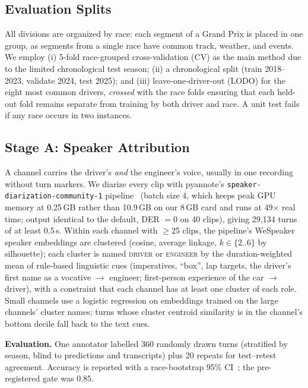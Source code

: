 \subsection{Evaluation Splits}
All divisions are organized by race: each segment of a Grand Prix is placed in one group, as segments from a single race have common track, weather, and events. We employ (i) 5-fold race-grouped cross-validation (CV) as the main method due to the limited chronological test season; (ii) a chronological split (train 2018--2023, validate 2024, test 2025); and (iii) leave-one-driver-out (LODO) for the eight most common drivers, \emph{crossed} with the race folds ensuring that each held-out fold remains separate from training by both driver and race. A unit test fails if any race occurs in two instances.


\subsection{Stage A: Speaker Attribution}
A channel carries the driver's \emph{and} the engineer's voice, usually in one recording without turn markers. We diarize every clip with pyannote's \texttt{speaker-diarization-community-1} pipeline~\cite{bredin2023pyannote,plaquet2023powerset} (batch size 4, which keeps peak GPU memory at 0.25\,GB rather than 10.9\,GB on our 8\,GB card and runs at 49$\times$ real time; output identical to the default, DER $=0$ on 40 clips), giving 29{,}134 turns of at least 0.5\,s. Within each channel with $\geq$25 clips, the pipeline's WeSpeaker~\cite{wang2023wespeaker} speaker embeddings are clustered (cosine, average linkage, $k\in\{2..6\}$ by silhouette); each cluster is named \textsc{driver} or \textsc{engineer} by the duration-weighted mean of rule-based linguistic cues (imperatives, ``box'', lap targets, the driver's first name as a vocative $\rightarrow$ engineer; first-person experience of the car $\rightarrow$ driver), with a constraint that each channel has at least one cluster of each role. Small channels use a logistic regression on embeddings trained on the large channels' cluster names; turns whose cluster centroid similarity is in the channel's bottom decile fall back to the text cues.

\textbf{Evaluation.} One annotator labelled 360 randomly drawn turns (stratified by season, blind to predictions and transcripts) plus 20 repeats for test--retest agreement. Accuracy is reported with a race-bootstrap 95\% CI~\cite{efron1979bootstrap}; the pre-registered gate was 0.85.

